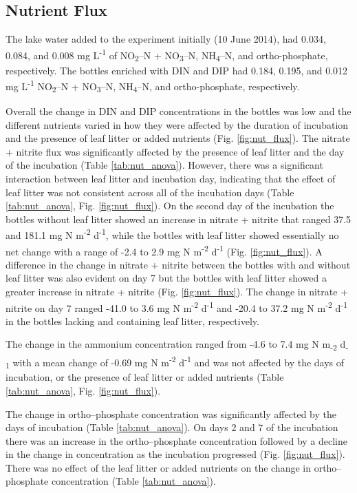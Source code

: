 
\subsection{Nutrient Flux}

The lake water added to the experiment initially (10 June 2014), had 0.034, 0.084, and 0.008 mg L\textsuperscript{-1} of NO\textsubscript{2}--N + NO\textsubscript{3}--N, NH\textsubscript{4}--N, and ortho-phosphate, respectively. The bottles enriched with DIN and DIP had 0.184, 0.195, and 0.012 mg L\textsuperscript{-1} NO\textsubscript{2}--N + NO\textsubscript{3}--N, NH\textsubscript{4}--N, and ortho-phosphate, respectively.

Overall the change in DIN and DIP concentrations in the bottles was low and the different nutrients varied in how they were affected by the duration of incubation and the presence of leaf litter or added nutrients (Fig. \ref{fig:nut_flux}).  The nitrate + nitrite flux was significantly affected by the presence of leaf litter and the day of the incubation (Table \ref{tab:nut_anova}). However, there was a significant interaction between leaf litter and incubation day, indicating that the effect of leaf litter was not consistent across all of the incubation days (Table \ref{tab:nut_anova}, Fig. \ref{fig:nut_flux}). On the second day of the incubation the bottles without leaf litter showed an increase in nitrate + nitrite that ranged 37.5 and 181.1 mg N m\textsuperscript{-2} d\textsuperscript{-1}, while the bottles with leaf litter showed essentially no net change with a range of -2.4 to 2.9 mg N m\textsuperscript{-2} d\textsuperscript{-1} (Fig. \ref{fig:nut_flux}).  A difference in the change in nitrate + nitrite between the bottles with and without leaf litter was also evident on day 7 but the bottles with leaf litter showed a greater increase in nitrate + nitrite (Fig. \ref{fig:nut_flux}). The change in nitrate + nitrite on day 7 ranged -41.0 to 3.6 mg N m\textsuperscript{-2} d\textsuperscript{-1} and -20.4 to 37.2 mg N m\textsuperscript{-2} d\textsuperscript{-1} in the bottles lacking and containing leaf litter, respectively. 

The change in the ammonium concentration ranged from -4.6 to 7.4 mg N m\textsubscript{-2} d\textsubscript{-1} with a mean change of -0.69 mg N m\textsuperscript{-2} d\textsuperscript{-1} and was not affected by the days of incubation, or the presence of leaf litter or added nutrients (Table \ref{tab:nut_anova}, Fig. \ref{fig:nut_flux}).

The change in ortho--phosphate concentration was significantly affected by the days of incubation (Table \ref{tab:nut_anova}). On days 2 and 7 of the incubation there was an increase in the ortho--phosphate concentration followed by a decline in the change in concentration as the incubation progressed (Fig. \ref{fig:nut_flux}). There was no effect of the leaf litter or added nutrients on the change in ortho--phosphate concentration (Table \ref{tab:nut_anova}).

